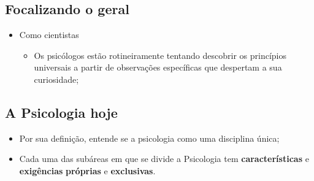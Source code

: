 \documentclass[
]{book}
\providecommand{\tightlist}{%
  \setlength{\itemsep}{0pt}\setlength{\parskip}{0pt}}
\begin{document}
\hypertarget{focalizando-o-geral}{%
\subsection{Focalizando o geral}\label{focalizando-o-geral}}

\begin{itemize}
\tightlist
\item
  Como cientistas

  \begin{itemize}
  \tightlist
  \item
    Os psicólogos estão rotineiramente tentando descobrir os princípios universais a partir de observações específicas que despertam a sua curiosidade;
  \end{itemize}
\end{itemize}

\hypertarget{a-psicologia-hoje}{%
\subsection{A Psicologia hoje}\label{a-psicologia-hoje}}

\begin{itemize}
\tightlist
\item
  Por sua definição, entende se a psicologia como uma disciplina única;
\item
  Cada uma das subáreas em que se divide a Psicologia tem \textbf{características} e \textbf{exigências} \textbf{próprias} e \textbf{exclusivas}.
\end{itemize}
\end{document}
